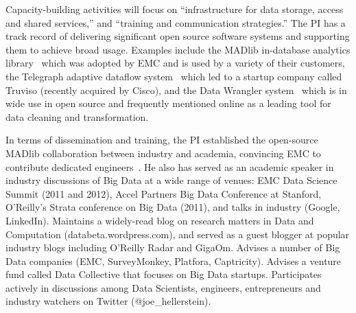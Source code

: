 

 
Capacity-building activities will focus on ``infrastructure for data
storage, access and shared services,'' and ``training and
communication strategies.''  The PI has a track record of
delivering significant open source software systems and
supporting them to achieve broad usage.  Examples include the MADlib in-database analytics library~\cite{madlib} which
was adopted by EMC and is used by a variety of their customers, the Telegraph adaptive dataflow system~\cite{telegraph} which led to a startup company called Truviso (recently acquired by Cisco), and the Data Wrangler system~\cite{datawrangler} which is in wide use in open source and frequently mentioned online as a leading tool for data cleaning and transformation.  

In
terms of dissemination and training, the PI established the open-source MADlib
  collaboration between industry and academia, convincing EMC to
  contribute dedicated engineers~\cite{madlib}.  He also has served as an academic
  speaker in industry discussions of Big Data at a wide range of venues: EMC Data Science Summit (2011
  and 2012), Accel Partners Big Data Conference at Stanford,
  O'Reilly's Strata conference on Big Data (2011), and talks in
  industry (Google, LinkedIn).  Maintains a widely-read blog on
  research matters in Data and Computation (databeta.wordpress.com),
  and served as a guest blogger at popular industry blogs including
  O'Reilly Radar and GigaOm.  Advises a number of Big Data companies
  (EMC, SurveyMonkey, Platfora, Captricity). Advises
  a venture fund called Data Collective that focuses on Big Data
  startups. Participates actively in discussions among Data
  Scientists, engineers, entrepreneurs and industry watchers on
  Twitter (@joe\_hellerstein).

